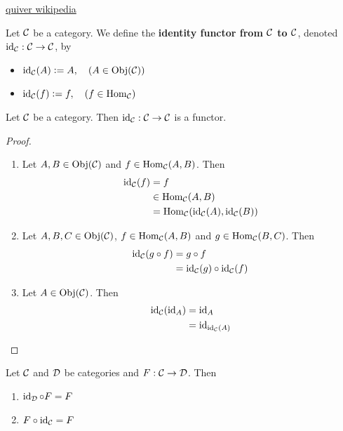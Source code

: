 \documentclass{book}
\begin{document}
\href{https://en.wikipedia.org/wiki/Quiver_(mathematics)#Path_algebra}{quiver wikipedia} 


\begin{defn} 
	Let $\mathcal{C}$ be a category. We define the \textbf{identity functor from $\mathcal{C}$ to $\mathcal{C}$}, denoted $\operatorname{id}_{\mathcal{C}}: \mathcal{C} \rightarrow \mathcal{C}$, by 
	\begin{itemize}
		\item $\operatorname{id}_{\mathcal{C}}(A) \vcentcolon= A, \quad (A \in \operatorname{Obj}(\mathcal{C}))$
		\item $\operatorname{id}_{\mathcal{C}}(f) \vcentcolon= f, \quad (f \in \operatorname{Hom}_{\mathcal{C}})$
	\end{itemize}
\end{defn}

\begin{ex} 
	Let $\mathcal{C}$ be a category. Then $\operatorname{id}_{\mathcal{C}}: \mathcal{C} \rightarrow \mathcal{C}$ is a functor.
\end{ex}

\begin{proof}\
	\begin{enumerate}
		\item Let $A, B \in \operatorname{Obj}(\mathcal{C})$ and $f \in \operatorname{Hom}_{\mathcal{C}}(A,B)$. Then 
		\begin{align*}
			\operatorname{id}_{\mathcal{C}}(f) 
			& = f \\
			& \in \operatorname{Hom}_{\mathcal{C}}(A, B) \\
			& = \operatorname{Hom}_{\mathcal{C}}(\operatorname{id}_{\mathcal{C}}(A), \operatorname{id}_{\mathcal{C}}(B)) \\
		\end{align*}
		\item Let $A,B, C \in \operatorname{Obj}(\mathcal{C})$, $f \in \operatorname{Hom}_{\mathcal{C}}(A,B)$ and $g \in \operatorname{Hom}_{\mathcal{C}}(B, C)$. Then 
		\begin{align*}
			\operatorname{id}_{\mathcal{C}}(g \circ f) 
			& = g \circ f \\
			& = \operatorname{id}_{\mathcal{C}}(g) \circ \operatorname{id}_{\mathcal{C}} (f)
		\end{align*}
		\item Let $A \in \operatorname{Obj}(\mathcal{C})$. Then 
		\begin{align*}
			\operatorname{id}_{\mathcal{C}}(\operatorname{id}_{A})
			& = \operatorname{id}_A \\
			& = \operatorname{id}_{\operatorname{id}_{\mathcal{C}}(A)}
		\end{align*}
	\end{enumerate}
\end{proof}

\begin{ex} 
	Let $\mathcal{C}$ and $\mathcal{D}$ be categories and $F:\mathcal{C} \rightarrow \mathcal{D}$. Then 
	\begin{enumerate}
		\item $\operatorname{id}_{\mathcal{D}} \circ F = F$
		\item $F \circ \operatorname{id}_{\mathcal{C}} = F$
	\end{enumerate}
\end{ex}
\end{document}
